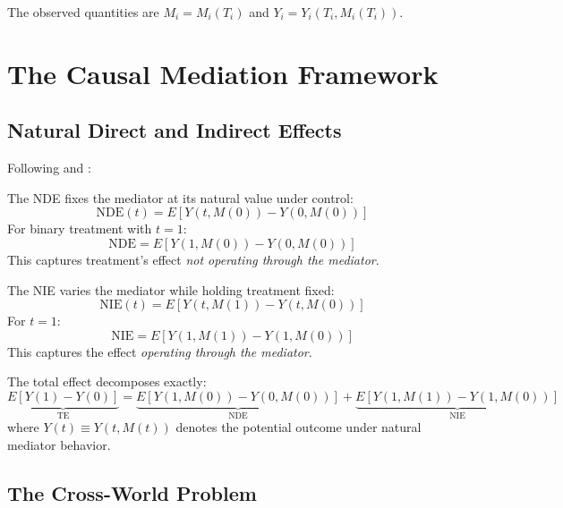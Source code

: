 The observed quantities are $M_i = M_i(T_i)$ and $Y_i = Y_i(T_i, M_i(T_i))$.


\section{The Causal Mediation Framework}

\subsection{Natural Direct and Indirect Effects}

Following \textcite{pearl2001direct} and \textcite{robins1992identifiability}:

\begin{definition}
The NDE fixes the mediator at its natural value under control:
\begin{equation}
\text{NDE}(t) = E[Y(t, M(0)) - Y(0, M(0))]
\end{equation}
For binary treatment with $t=1$:
\begin{equation}
\text{NDE} = E[Y(1, M(0)) - Y(0, M(0))]
\end{equation}
This captures treatment's effect \textit{not operating through the mediator}.
\end{definition}

\begin{definition}
The NIE varies the mediator while holding treatment fixed:
\begin{equation}
\text{NIE}(t) = E[Y(t, M(1)) - Y(t, M(0))]
\end{equation}
For $t=1$:
\begin{equation}
\text{NIE} = E[Y(1, M(1)) - Y(1, M(0))]
\end{equation}
This captures the effect \textit{operating through the mediator}.
\end{definition}

\begin{proposition}
The total effect decomposes exactly:
\begin{equation}
\underbrace{E[Y(1) - Y(0)]}_{\text{TE}} = \underbrace{E[Y(1, M(0)) - Y(0, M(0))]}_{\text{NDE}} + \underbrace{E[Y(1, M(1)) - Y(1, M(0))]}_{\text{NIE}}
\end{equation}
where $Y(t) \equiv Y(t, M(t))$ denotes the potential outcome under natural mediator behavior.
\end{proposition}

\subsection{The Cross-World Problem}


